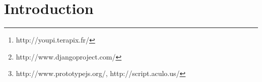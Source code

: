 \documentclass[11pt,twoside]{article}  %
\begin{document}
\setcounter{footnote}{3}


\begin{abstract} 
Youpi\footnote{http://youpi.terapix.fr/} stands for ``YOUpi is your processing PIpeline''. 
It is a portable, easy to use web application providing high level functionalities to perform 
data reduction on scientific FITS images. It is built on top of open source processing tools 
that are released to the community by Terapix, in order to organize your data on a computer 
cluster, to manage your processing jobs in real time and to facilitate teamwork by allowing 
fine-grain sharing of results and data. On the server side, Youpi is written in the \emph{Python}
programming language and uses the \emph{Django}\footnote{http://www.djangoproject.com/} web 
framework. On the client side, Ajax techniques are used along with the \emph{Prototype} and 
\emph{script.aculo.us} Javascript librairies\footnote{http://www.prototypejs.org/, http://script.aculo.us/}.
\end{abstract}


\section{Introduction}
\end{document}
